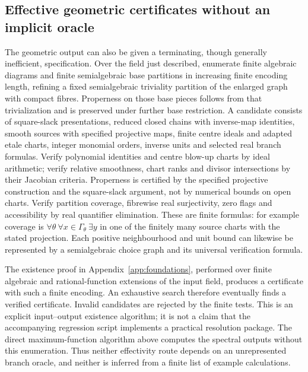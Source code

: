 \subsection{Effective geometric certificates without an implicit oracle}
The geometric output can also be given a terminating, though generally
inefficient, specification. Over the field just described, enumerate
finite algebraic diagrams and finite semialgebraic base partitions in
increasing finite encoding length, refining a fixed semialgebraic
triviality partition of the enlarged graph with compact fibres. Properness
on those base pieces follows from that trivialization and is preserved
under further base restriction. A candidate consists of square-slack
presentations, reduced closed chains with inverse-map identities, smooth
sources with specified projective maps, finite centre ideals and adapted
etale charts, integer monomial orders, inverse units and selected real
branch formulas. Verify polynomial identities and centre blow-up charts
by ideal arithmetic; verify relative smoothness, chart ranks and divisor
intersections by their Jacobian criteria. Properness is certified by the
specified projective construction and the square-slack argument, not by
numerical bounds on open charts. Verify partition coverage, fibrewise
real surjectivity, zero flags and accessibility by real quantifier
elimination. These are finite formulas: for example coverage is
$\forall\theta\ \forall x\in\Gamma_\theta\ \exists y$ in one of
the finitely many source charts with the stated projection. Each
positive neighbourhood and unit bound can likewise be represented by a
semialgebraic choice graph and its universal verification formula.

The existence proof in Appendix~\ref{app:foundations}, performed over
finite algebraic and rational-function extensions of the input field,
produces a certificate with such a finite encoding. An exhaustive search
therefore eventually finds a verified certificate. Invalid candidates are
rejected by the finite tests. This is an explicit input--output existence
algorithm; it is not a claim that the accompanying regression script
implements a practical resolution package. The direct maximum-function
algorithm above computes the spectral outputs without this enumeration.
Thus neither effectivity route depends on an unrepresented branch oracle,
and neither is inferred from a finite list of example calculations.
